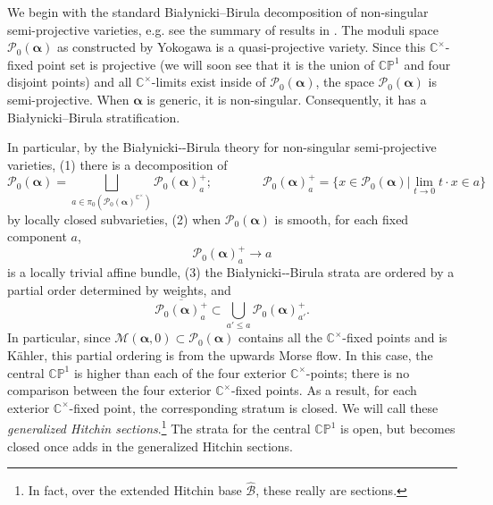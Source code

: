 \documentclass[12pt,letterpaper,reqno]{amsart}
\def\mathbf#1{#1}%
\theoremstyle{remark}
\theoremstyle{definition}
\numberwithin{thm}{section}
\numberwithin{equation}{section}
\numberwithin{figure}{section}
\newcommand{\C}{\ensuremath{\mathbb C}}
\newcommand{\CP}{\ensuremath{\mathbb {CP}}}
\newcommand{\bsa}{\boldsymbol{\alpha}}
\begin{document}
We begin with the standard
Bia{\l}ynicki--Birula decomposition of non-singular semi-projective varieties, e.g. see the summary of results in \cite[\S1.2]{hausel2013cohomologylargesemiprojectivehyperkaehler}. 
 The moduli space $\mathcal{P}_0(\bsa)$ as constructed by Yokogawa is a quasi-projective variety.  Since this $\C^\times$-fixed point set is projective (we will soon see that it is the union of $\CP^1$ and four disjoint points) and all $\C^\times$-limits exist inside of $\mathcal{P}_0(\bsa)$, the space $\mathcal{P}_0(\bsa)$ is semi-projective. When $\bsa$ is generic, it is non-singular.  Consequently, it has a Bia{\l}ynicki--Birula stratification. 
 
 In particular,  by the Bia{\l}ynicki‑-Birula theory for non-singular semi‑projective varieties, (1) there is a decomposition of 
 \[\mathcal{P}_0(\bsa)= \bigsqcup_{a \in \pi_0(\mathcal{P}_0(\bsa)^{\C^\times})} \mathcal{P}_0(\bsa)_a^+; \qquad \qquad  \mathcal{P}_0(\bsa)_a^+ =\{x \in \mathcal{P}_0(\bsa) | \lim_{t \to 0} t \cdot x \in a\} \]
 by locally closed subvarieties, (2) when $\mathcal{P}_0(\bsa)$ is smooth, for each fixed component $a$,  
 \[\mathcal{P}_0(\bsa)_a^+ \to a\] 
 is a locally trivial affine bundle, (3) the Bia{\l}ynicki‑-Birula strata are ordered by a partial order determined by weights, and 
 \[\overline{\mathcal{P}_0(\bsa)_a^+} \subset \bigcup_{a' \leq a} \mathcal{P}_0(\bsa)_{a'}^+.\]
 In particular, since $\mathcal{M}(\bsa, \mathbf{0}) \subset \mathcal{P}_0(\bsa)$ contains all the $\C^\times$-fixed points and is K\"ahler, this partial ordering is from the upwards Morse flow. In this case, the central $\CP^1$ is higher than each of the four exterior $\C^\times$-points; there is no comparison between the four exterior $\C^\times$-fixed points.  As a result, for each exterior $\C^\times$-fixed point, the corresponding stratum is closed. We will call these \emph{generalized Hitchin sections}.\footnote{In fact, over the extended Hitchin base $\hat{\mathcal{B}}$, these really are sections.}  The strata for the central $\CP^1$ is open, but becomes closed once adds in the generalized Hitchin sections.   
\end{document}
